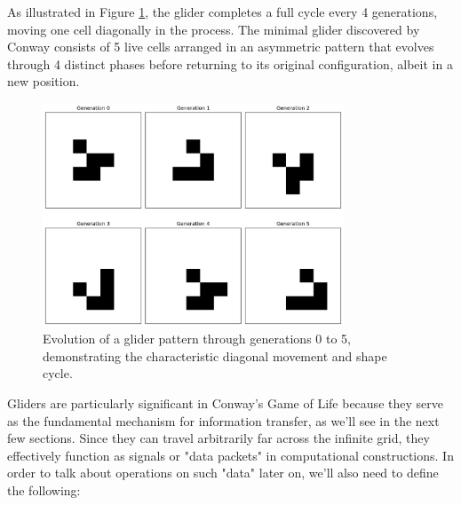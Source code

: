 \documentclass{article}
\theoremstyle{definition}
\theoremstyle{plain}
\theoremstyle{plain}
\begin{document}
As illustrated in Figure \ref{fig:glider-generations}, the glider completes a full cycle every 4 generations, moving one cell diagonally in the process. The minimal glider discovered by Conway consists of 5 live cells arranged in an asymmetric pattern that evolves through 4 distinct phases before returning to its original configuration, albeit in a new position.

\begin{figure}[H]
  \centering
  \includegraphics[width=0.8\textwidth]{figures/glider_generations_0_to_5.png}
  \caption{Evolution of a glider pattern through generations 0 to 5, demonstrating the characteristic diagonal movement and shape cycle.}
  \label{fig:glider-generations}
\end{figure}

Gliders are particularly significant in Conway's Game of Life because they serve as the fundamental mechanism for information transfer, as we'll see in the next few sections. Since they can travel arbitrarily far across the infinite grid, they effectively function as signals or "data packets" in computational constructions. In order to talk about operations on such "data" later on, we'll also need to define the following:
\end{document}

